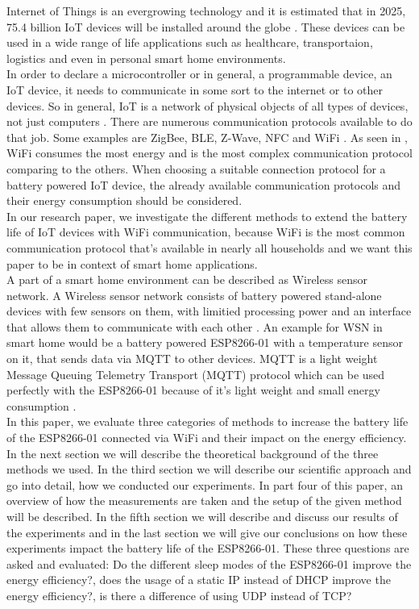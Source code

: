 Internet of Things is an evergrowing technology and it is estimated that in 2025, 75.4 billion IoT devices will be installed around the globe \cite{lucero2016iot}. These devices can be used in a wide range of life applications such as healthcare, transportaion, logistics and even in personal smart home environments.\\  
In order to declare a microcontroller or in general, a programmable device, an IoT device, it needs to communicate in some sort to the internet or to other devices. So in general, IoT is a network of physical objects of all types of devices, not just computers \cite{patel2016internet}. There are numerous communication protocols available to do that job. Some examples are ZigBee, BLE, Z-Wave, NFC and WiFi \cite{8079928}. As seen in \cite{8088226}, WiFi consumes the most energy and is the most complex communication protocol comparing to the others.  
When choosing a suitable connection protocol for a battery powered IoT device, the already available communication protocols and their energy consumption should be considered.\\
In our research paper, we investigate the different methods to extend the battery life of IoT devices with WiFi communication, because WiFi is the most common communication protocol that's available in nearly all households and we want this paper to be in context of smart home applications.\\
A part of a smart home environment can be described as Wireless sensor network. A Wireless sensor network consists of battery powered stand-alone devices with few sensors on them, with limitied processing power and an interface that allows them to communicate with each other \cite{wsn}. 
An example for WSN in smart home would be a battery powered ESP8266-01 with a temperature sensor on it, that sends data via MQTT to other devices.
MQTT is a light weight Message Queuing Telemetry Transport (MQTT) protocol which can be used perfectly with the ESP8266-01 because of it's light weight and small energy consumption \cite{kodali_mqtt_2016}.\\
In this paper, we evaluate three categories of methods to increase the battery life of the ESP8266-01 connected via WiFi and their impact on the energy efficiency.\\
In the next section we will describe the theoretical background of the three methods we used. 
In the third section we will describe our scientific approach and go into detail, how we conducted our experiments.
In part four of this paper, an overview of how the measurements are taken and the setup of the given method will be described.
In the fifth section we will describe and discuss our results of the experiments and in the last section we will give our conclusions on how these experiments impact the battery life of the ESP8266-01.
These three questions are asked and evaluated: Do the different sleep modes of the ESP8266-01 improve the energy efficiency?, does the usage of a static IP instead of DHCP improve the energy efficiency?, is there a difference of using UDP instead of TCP?

